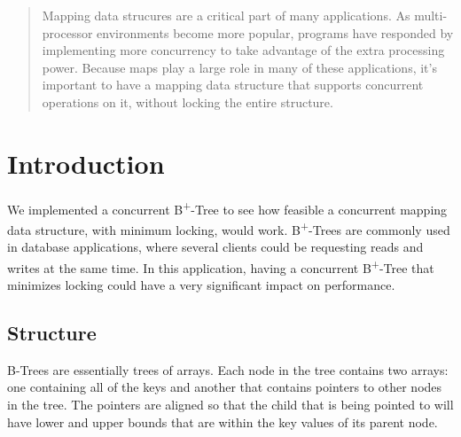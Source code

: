 \documentclass[conference]{IEEEtran}
\begin{document}
\begin{abstract}
Mapping data strucures are a critical part of many applications. As multi-processor
environments become more popular, programs have responded by implementing
more concurrency to take advantage of the extra processing power. Because maps
play a large role in many of these applications, it's important to have a 
mapping data structure that supports concurrent operations on it, without
locking the entire structure.
\end{abstract}





%
\IEEEpeerreviewmaketitle



\section{Introduction}
We implemented a concurrent B\textsuperscript{+}-Tree to see how feasible a
concurrent mapping data structure, with minimum locking, would work.
B\textsuperscript{+}-Trees are commonly used in database applications, where
several clients could be requesting reads and writes at the same time. In this
application, having a concurrent B\textsuperscript{+}-Tree that minimizes
locking could have a very significant impact on performance.

\subsection{Structure}
B-Trees are essentially trees of arrays. Each node in the tree contains two
arrays: one containing all of the keys and another that contains pointers to
other nodes in the tree. The pointers are aligned so that the child that is
being pointed to will have lower and upper bounds that are within the key values
of its parent node.
\end{document}

